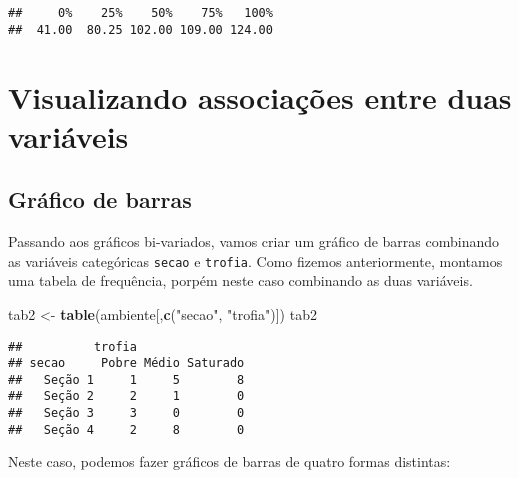 \documentclass[
]{book}
\newenvironment{Shaded}{\begin{snugshade}}{\end{snugshade}}
\newcommand{\DataTypeTok}[1]{\textcolor[rgb]{0.13,0.29,0.53}{#1}}
\newcommand{\DecValTok}[1]{\textcolor[rgb]{0.00,0.00,0.81}{#1}}
\newcommand{\FloatTok}[1]{\textcolor[rgb]{0.00,0.00,0.81}{#1}}
\newcommand{\KeywordTok}[1]{\textcolor[rgb]{0.13,0.29,0.53}{\textbf{#1}}}
\newcommand{\NormalTok}[1]{#1}
\newcommand{\OperatorTok}[1]{\textcolor[rgb]{0.81,0.36,0.00}{\textbf{#1}}}
\newcommand{\StringTok}[1]{\textcolor[rgb]{0.31,0.60,0.02}{#1}}
\begin{document}
\begin{Shaded}
\end{Shaded}

\begin{verbatim}
##     0%    25%    50%    75%   100% 
##  41.00  80.25 102.00 109.00 124.00
\end{verbatim}

\hypertarget{visualizando-associauxe7uxf5es-entre-duas-variuxe1veis}{%
\section{Visualizando associações entre duas variáveis}\label{visualizando-associauxe7uxf5es-entre-duas-variuxe1veis}}

\hypertarget{gruxe1fico-de-barras-1}{%
\subsection{Gráfico de barras}\label{gruxe1fico-de-barras-1}}

Passando aos gráficos bi-variados, vamos criar um gráfico de barras combinando as variáveis categóricas \texttt{secao} e \texttt{trofia}. Como fizemos anteriormente, montamos uma tabela de frequência, porpém neste caso combinando as duas variáveis.

\begin{Shaded}
\begin{Highlighting}[]
\NormalTok{tab2 <-}\StringTok{ }\KeywordTok{table}\NormalTok{(ambiente[,}\KeywordTok{c}\NormalTok{(}\StringTok{"secao"}\NormalTok{, }\StringTok{"trofia"}\NormalTok{)])}
\NormalTok{tab2}
\end{Highlighting}
\end{Shaded}

\begin{verbatim}
##          trofia
## secao     Pobre Médio Saturado
##   Seção 1     1     5        8
##   Seção 2     2     1        0
##   Seção 3     3     0        0
##   Seção 4     2     8        0
\end{verbatim}

Neste caso, podemos fazer gráficos de barras de quatro formas distintas:
\end{document}
